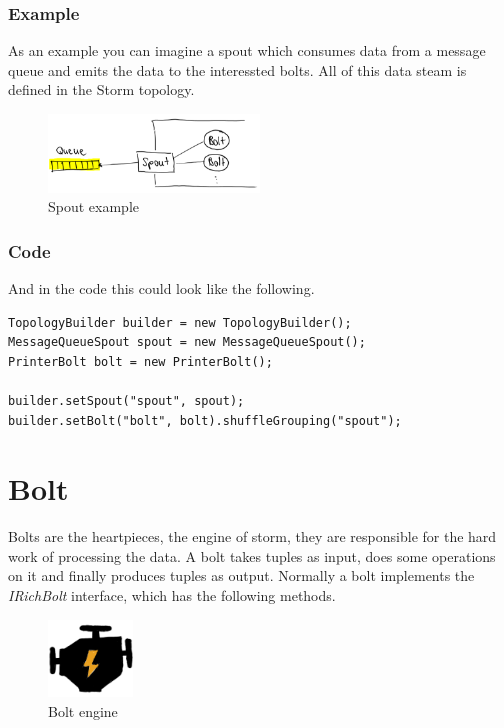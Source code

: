 \subsubsection{Example}
As an example you can imagine a spout which consumes data from a message queue and emits the data
to the interessted bolts. All of this data steam is defined in the Storm topology.

\begin{figure}[H]
\centering
\captionsetup{justification=centering}
\includegraphics[width=0.5\textwidth]{images/spout_example.png}
\caption[Spout example]{Spout example}
\end{figure}

\subsubsection{Code}
And in the code this could look like the following.
\begin{lstlisting}
TopologyBuilder builder = new TopologyBuilder();
MessageQueueSpout spout = new MessageQueueSpout();
PrinterBolt bolt = new PrinterBolt();

builder.setSpout("spout", spout);
builder.setBolt("bolt", bolt).shuffleGrouping("spout");
\end{lstlisting}


\newpage

\section{Bolt}
Bolts are the heartpieces, the engine of storm, they are responsible for the hard work of processing the data.
A bolt takes tuples as input, does some operations on it and finally produces tuples as output.
Normally a bolt implements the \textit{IRichBolt} interface, which has the following methods.

\begin{figure}[H]
\centering
\captionsetup{justification=centering}
\includegraphics[width=0.2\textwidth]{images/engine.png}
\caption[Bolt engine]{Bolt engine}
\end{figure}


